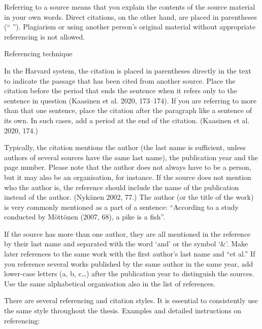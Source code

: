 \documentclass{article}
\begin{document}
\bigskip

Referring to a source means that you explain the contents of the source material in your own words. Direct citations, on
the other hand, are placed in parentheses (“ ”). Plagiarism or using another person’s original material without
appropriate referencing is not allowed.


\bigskip


\bigskip

Referencing technique


\bigskip

In the Harvard system, the citation is placed in parentheses directly in the text to indicate the passage that has been
cited from another source. Place the citation before the period that ends the sentence when it refers only to the
sentence in question (Kaasinen et al. 2020, 173–174). If you are referring to more than that one sentence, place the
citation after the paragraph like a sentence of its own. In such cases, add a period at the end of the citation.
(Kaasinen et al. 2020, 174.)


\bigskip

Typically, the citation mentions the author (the last name is sufficient, unless authors of several sources have the
same last name), the publication year and the page number. Please note that the author does not always have to be a
person, but it may also be an organisation, for instance. If the source does not mention who the author is, the
reference should include the name of the publication instead of the author. (Nykänen 2002, 77.) The author (or the
title of the work) is very commonly mentioned as a part of a sentence: “According to a study conducted by Möttönen
(2007, 68), a pike is a fish”.


\bigskip

If the source has more than one author, they are all mentioned in the reference by their last name and separated with
the word ‘and’ or the symbol ‘\&’. Make later references to the same work with the first author’s last name and “et
al.” If you reference several works published by the same author in the same year, add lower-case letters (a, b, c…)
after the publication year to distinguish the sources. Use the same alphabetical organisation also in the list of
references.


\bigskip

There are several referencing and citation styles. It is essential to consistently use the same style throughout the
thesis. Examples and detailed instructions on referencing:
\end{document}
